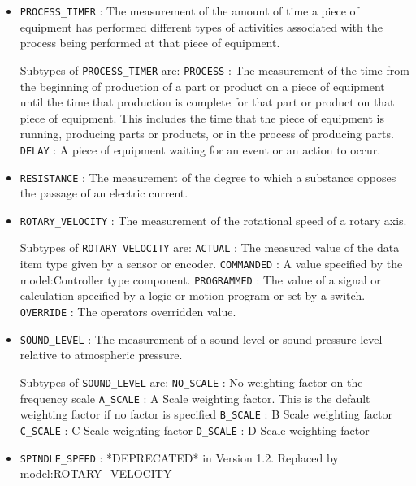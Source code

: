 \begin{itemize}
\item \texttt{PROCESS_TIMER} : The measurement of the amount of time a piece of equipment has performed different types of activities associated with the process being performed at that piece of equipment. 

Subtypes of \texttt{PROCESS_TIMER} are: 
\newline\tab \texttt{PROCESS} : The measurement of the time from the beginning of production of a part or product on a piece of equipment until the time that production is complete for that part or product on that piece of equipment.  This includes the time that the piece of equipment is running, producing parts or products, or in the process of producing parts. 
\newline\tab \texttt{DELAY} : A piece of equipment waiting for an event or an action to occur. 
\item \texttt{RESISTANCE} : The measurement of the degree to which a substance opposes the passage of an electric current. 

\item \texttt{ROTARY_VELOCITY} : The measurement of the rotational speed of a rotary axis. 

Subtypes of \texttt{ROTARY_VELOCITY} are: 
\newline\tab \texttt{ACTUAL} : The measured value of the data item type given by a sensor or encoder. 
\newline\tab \texttt{COMMANDED} : A value specified by the {model:Controller} type component. 
\newline\tab \texttt{PROGRAMMED} : The value of a signal or calculation specified by a logic or motion program or set by a switch. 
\newline\tab \texttt{OVERRIDE} : The operators overridden value. 
\item \texttt{SOUND_LEVEL} : The measurement of a sound level or sound pressure level relative to atmospheric pressure. 

Subtypes of \texttt{SOUND_LEVEL} are: 
\newline\tab \texttt{NO_SCALE} : No weighting factor on the frequency scale 
\newline\tab \texttt{A_SCALE} : A Scale weighting factor.   This is the default weighting factor if no factor is specified 
\newline\tab \texttt{B_SCALE} : B Scale weighting factor 
\newline\tab \texttt{C_SCALE} : C Scale weighting factor 
\newline\tab \texttt{D_SCALE} : D Scale weighting factor 
\item \texttt{SPINDLE_SPEED} : *DEPRECATED* in Version 1.2.  Replaced by {model:ROTARY_VELOCITY} 


\end{itemize}
